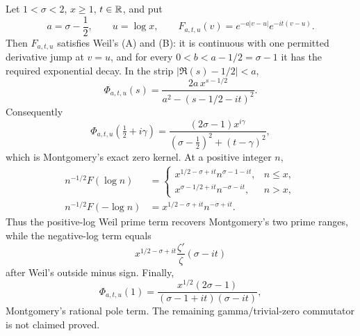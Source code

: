 \begin{theorem}
\label{thm:montgomery-weil-poisson-complete}
Let $1<\sigma<2$, $x\geq1$, $t\in\mathbb R$, and put
\[
 a=\sigma-\frac12,\qquad u=\log x,\qquad
 F_{a,t,u}(v)=e^{-a|v-u|}e^{-it(v-u)}.
\]
Then $F_{a,t,u}$ satisfies Weil's (A) and (B): it is continuous with one
permitted derivative jump at $v=u$, and for every
$0<b<a-1/2=\sigma-1$ it has the required exponential decay.  In the strip
$|\Re(s)-1/2|<a$,
\begin{equation}
 \Phi_{a,t,u}(s)
 =\frac{2a\,x^{s-1/2}}
 {a^2-(s-1/2-it)^2}.
 \label{eq:poisson-transform-complete}
\end{equation}
Consequently
\begin{equation}
 \Phi_{a,t,u}(\tfrac12+i\gamma)
 =\frac{(2\sigma-1)x^{i\gamma}}
 { (\sigma-\tfrac12)^2+(t-\gamma)^2},
 \label{eq:poisson-zero-complete}
\end{equation}
which is Montgomery's exact zero kernel.  At a positive integer $n$,
\begin{align}
 n^{-1/2}F(\log n)
 &=\begin{cases}
 x^{1/2-\sigma+it}n^{\sigma-1-it},&n\leq x,\\
 x^{\sigma-1/2+it}n^{-\sigma-it},&n>x,
 \end{cases}\label{eq:poisson-positive-prime-complete}\\
 n^{-1/2}F(-\log n)
 &=x^{1/2-\sigma+it}n^{-\sigma+it}.
 \label{eq:poisson-negative-prime-complete}
\end{align}
Thus the positive-log Weil prime term recovers Montgomery's two prime ranges,
while the negative-log term equals
\begin{equation}
 x^{1/2-\sigma+it}\frac{\zeta'}{\zeta}(\sigma-it)
 \label{eq:poisson-logderivative-complete}
\end{equation}
after Weil's outside minus sign.  Finally,
\begin{equation}
 \Phi_{a,t,u}(1)
 =\frac{x^{1/2}(2\sigma-1)}
 { (\sigma-1+it)(\sigma-it)},
 \label{eq:poisson-pole-complete}
\end{equation}
Montgomery's rational pole term.  The remaining gamma/trivial-zero
commutator is not claimed proved.
\end{theorem}

